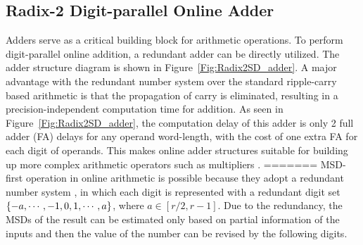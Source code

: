 \documentclass{acm_proc_article-sp}
\begin{document}
\subsection{Radix-2 Digit-parallel Online Adder \label{OnlineAdderSection}}
Adders serve as a critical building block for arithmetic operations. To perform digit-parallel online addition, a redundant adder can be directly utilized. The adder structure diagram is shown in Figure~\ref{Fig:Radix2SD_adder}. A major advantage with the redundant number system over the standard ripple-carry based arithmetic is that the propagation of carry is eliminated, resulting in a precision-independent computation time for addition. As seen in Figure~\ref{Fig:Radix2SD_adder}, the computation delay of this adder is only 2 full adder (FA) delays for any operand word-length, with the cost of one extra FA for each digit of operands. This makes online adder structures suitable for building up more complex arithmetic operators such as multipliers \cite{RedundantMult_1987,RedundantMult_1985}.
=======
MSD-first operation in online arithmetic is possible because they adopt a redundant number system \cite{RedundantNumber}, in which each digit is represented with a redundant digit set $\{-a, \cdots,-1,\\0, 1, \cdots, a\}$, where $a\in[r/2,r-1]$. Due to the redundancy, the MSDs of the result can be estimated only based on partial information of the inputs and then the value of the number can be revised by the following digits.
\end{document}
